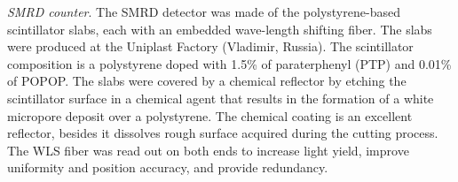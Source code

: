 %
%
 
{\it SMRD counter}. The SMRD detector was made of the polystyrene-based scintillator slabs, each with an embedded wave-length shifting  fiber. The slabs were produced at the Uniplast Factory (Vladimir, Russia). The scintillator composition is a polystyrene doped with 1.5\% of paraterphenyl (PTP) and 0.01\% of POPOP. The slabs were covered by a chemical reflector by etching the scintillator surface  in a chemical agent that results in the formation of a white micropore deposit over a polystyrene\cite{extrusion}.  The chemical coating is an excellent reflector, besides it dissolves  rough surface acquired during the cutting process. The WLS fiber was read out on both ends to increase light yield, improve uniformity and position accuracy, and provide redundancy.

